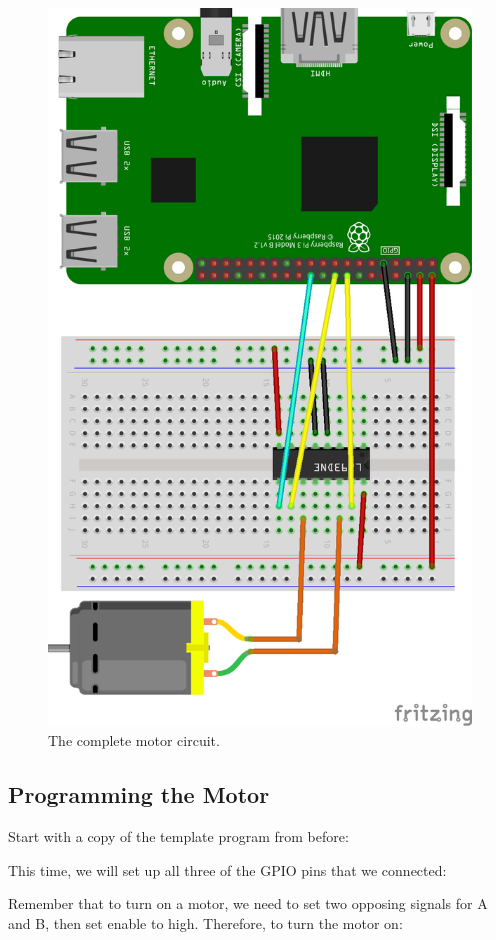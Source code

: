 		\begin{figure}[h]
			\centering
			\includegraphics[width=0.7\linewidth]{McrRaspJam/011_Motors/2_motor/schematic_5}
			\caption{The complete motor circuit.}
			\label{fig:schematic_5}
		\end{figure}
		
	\subsection{Programming the Motor}
	
		Start with a copy of the template program from before:
		
		
		
		This time, we will set up all three of the GPIO pins that we connected:
	
		
		
		Remember that to turn on a motor, we need to set two opposing signals for A and B, then set enable to high. Therefore, to turn the motor on:
		
